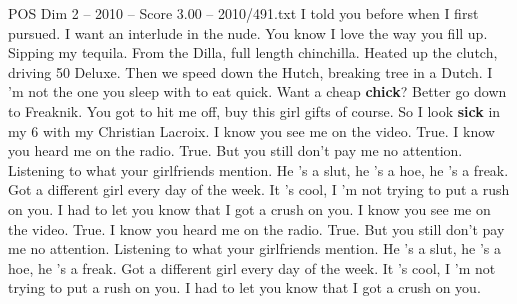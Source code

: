 \begin{textsample}{POS Dim 2 – 2010 – Score 3.00 – 2010/491.txt}
I told you before when I first pursued.
I want an interlude in the nude.
You know I love the way you fill up.
Sipping my tequila.
From the Dilla, full length chinchilla.
Heated up the clutch, driving 50 Deluxe.
Then we speed down the Hutch, breaking tree in a Dutch.
I 'm not the one you sleep with to eat quick.
Want a cheap \textbf{chick}?
Better go down to Freaknik.
You got to hit me off, buy this girl gifts of course.
So I look \textbf{sick} in my 6 with my Christian Lacroix.
I know you see me on the video.
True.
I know you heard me on the radio.
True.
But you still don't pay me no attention.
Listening to what your girlfriends mention.
He 's a slut, he 's a hoe, he 's a freak.
Got a different girl every day of the week.
It 's cool, I 'm not trying to put a rush on you.
I had to let you know that I got a crush on you.
I know you see me on the video.
True.
I know you heard me on the radio.
True.
But you still don't pay me no attention.
Listening to what your girlfriends mention.
He 's a slut, he 's a hoe, he 's a freak.
Got a different girl every day of the week.
It 's cool, I 'm not trying to put a rush on you.
I had to let you know that I got a crush on you.

\end{textsample}
